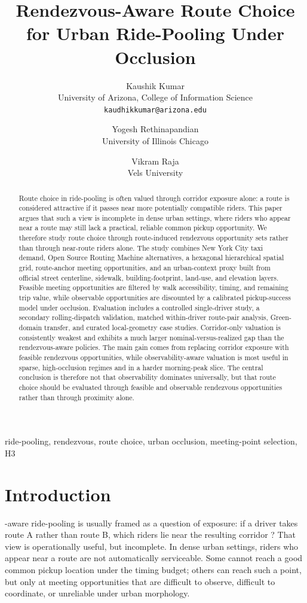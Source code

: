 \documentclass[journal]{IEEEtran}
\title{Rendezvous-Aware Route Choice for Urban Ride-Pooling Under Occlusion}
\author{%
Kaushik Kumar\\
University of Arizona, College of Information Science\\
\texttt{kaudhikkumar@arizona.edu}
\and
Yogesh Rethinapandian\\
University of Illinois Chicago
\and
Vikram Raja\\
Vels University}
\begin{document}
\maketitle
\vspace{-0.8em}

\begin{abstract}
Route choice in ride-pooling is often valued through corridor exposure alone: a route is considered attractive if it passes near more potentially compatible riders. This paper argues that such a view is incomplete in dense urban settings, where riders who appear near a route may still lack a practical, reliable common pickup opportunity. We therefore study route choice through route-induced rendezvous opportunity sets rather than through near-route riders alone. The study combines New York City taxi demand, Open Source Routing Machine alternatives, a hexagonal hierarchical spatial grid, route-anchor meeting opportunities, and an urban-context proxy built from official street centerline, sidewalk, building-footprint, land-use, and elevation layers. Feasible meeting opportunities are filtered by walk accessibility, timing, and remaining trip value, while observable opportunities are discounted by a calibrated pickup-success model under occlusion. Evaluation includes a controlled single-driver study, a secondary rolling-dispatch validation, matched within-driver route-pair analysis, Green-domain transfer, and curated local-geometry case studies. Corridor-only valuation is consistently weakest and exhibits a much larger nominal-versus-realized gap than the rendezvous-aware policies. The main gain comes from replacing corridor exposure with feasible rendezvous opportunities, while observability-aware valuation is most useful in sparse, high-occlusion regimes and in a harder morning-peak slice. The central conclusion is therefore not that observability dominates universally, but that route choice should be evaluated through feasible and observable rendezvous opportunities rather than through proximity alone.
\end{abstract}

\begin{IEEEkeywords}
ride-pooling, rendezvous, route choice, urban occlusion, meeting-point selection, H3
\end{IEEEkeywords}

\section{Introduction}
-aware ride-pooling is usually framed as a question of exposure: if a driver takes route A rather than route B, which riders lie near the resulting corridor \cite{santi2014,tachet2017,alonso2017,ma2013tshare,ozkan2020dynamic}? That view is operationally useful, but incomplete. In dense urban settings, riders who appear near a route are not automatically serviceable. Some cannot reach a good common pickup location under the timing budget; others can reach such a point, but only at meeting opportunities that are difficult to observe, difficult to coordinate, or unreliable under urban morphology.
\end{document}
